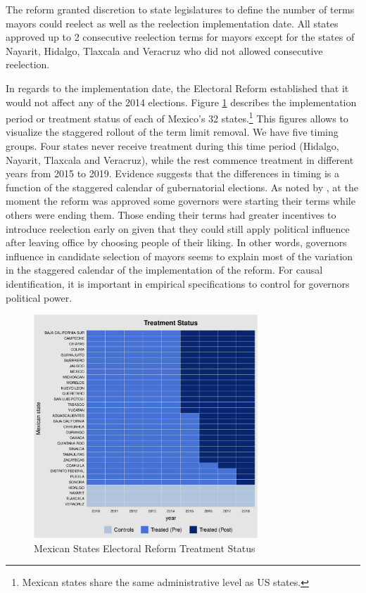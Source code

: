 \documentclass[12pt]{amsart}
\numberwithin{equation}{section}
\theoremstyle{definition}
\theoremstyle{definition}
\theoremstyle{definition}
\begin{document}
The reform granted discretion to state legislatures to define the number of terms mayors could reelect as well as the reelection implementation date. All states approved up to 2 consecutive reelection terms for mayors except for the states of Nayarit, Hidalgo, Tlaxcala and Veracruz who did not allowed consecutive reelection. 
  
In regards to the implementation date, the Electoral Reform established that it would not affect any of the 2014 elections. Figure \ref{fig:treatment_status} describes the implementation period or treatment status of each of Mexico's 32 states.\footnote{Mexican states share the same administrative level as US states.} This figures allows to visualize the staggered rollout of the term limit removal. We have five timing groups. Four states never receive treatment during this time period (Hidalgo, Nayarit, Tlaxcala and Veracruz), while the rest commence treatment in different years from 2015 to 2019. Evidence suggests that the differences in timing is a function of the staggered calendar of gubernatorial elections. As noted by \citet{motolinia_2020}, at the moment the reform was approved some governors were starting their terms while others were ending them. Those ending their terms had greater incentives to introduce reelection early on given that they could still apply political influence after leaving office by choosing people of their liking. In other words, governors influence in candidate selection of mayors seems to explain most of the variation in the staggered calendar of the implementation of the reform. For causal identification, it is important in empirical specifications to control for governors political power. 
   
\begin{figure}[h]   
\centering 
\caption{Mexican States Electoral Reform Treatment Status}
\label{fig:treatment_status}
\includegraphics[width=0.75\textwidth]{Figures_incumbency/reform_treatmentstatus.pdf}     
\captionsetup{justification=centering} 
\end{figure}         
\end{document}
